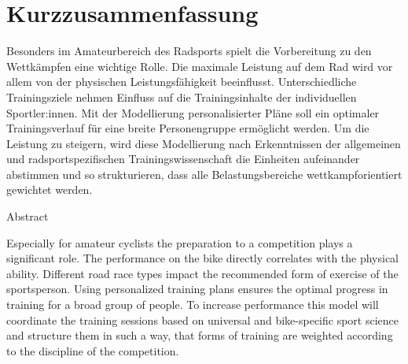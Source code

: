 \chapter*{Kurzzusammenfassung}
\label{sec:abstract}
\vspace*{-10mm}
Besonders im Amateurbereich des Radsports spielt die Vorbereitung zu den Wettkämpfen eine wichtige Rolle. Die maximale Leistung auf dem Rad wird vor allem von der physischen Leistungsfähigkeit beeinflusst. Unterschiedliche Trainingsziele nehmen Einfluss auf die Trainingsinhalte der individuellen Sportler:innen. Mit der Modellierung personalisierter Pläne soll ein optimaler Trainingsverlauf für eine breite Personengruppe ermöglicht werden.
Um die Leistung zu steigern, wird diese Modellierung nach Erkenntnissen der allgemeinen und radsportspezifischen Trainingswissenschaft die Einheiten aufeinander abstimmen und so strukturieren, dass alle Belastungsbereiche wettkampforientiert gewichtet werden.
\vspace*{20mm}

{Abstract}
\label{sec:abstract-diff}

Especially for amateur cyclists the preparation to a competition plays a significant role. The performance on the bike directly correlates with the physical ability. Different road race types impact the recommended form of exercise of the sportsperson. Using personalized training plans ensures the optimal progress in training for a broad group of people.
To increase performance this model will coordinate the training sessions based on universal and bike-specific sport science and structure them in such a way, that forms of training are weighted according to the discipline of the competition.